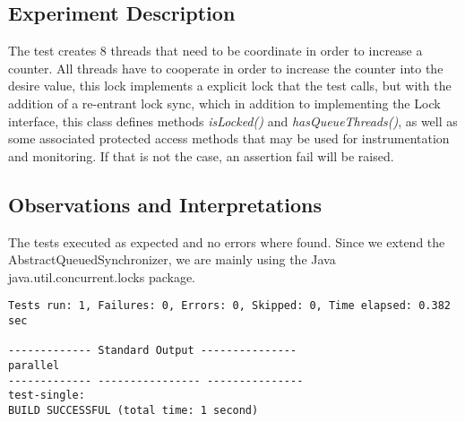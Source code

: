
\subsection{Experiment Description} 
\par
The test creates $8$ threads that need to be coordinate in order to increase a counter. All threads have to cooperate in order to increase the counter into the desire value, this lock implements a explicit lock that the test calls, but with the addition of a re-entrant lock sync, which in addition to implementing the Lock interface, this class defines methods \textit{isLocked()} and \textit{hasQueueThreads()}, as well as some associated protected access methods that may be used for instrumentation and monitoring.
If that is not the case, an assertion fail will be raised.
\par



\subsection{Observations and Interpretations}

\par
The tests executed as expected and no errors where found. Since we extend the AbstractQueuedSynchronizer, we are mainly using the Java java.util.concurrent.locks package.
\begin{lstlisting}[frame=single,breaklines=true]
Tests run: 1, Failures: 0, Errors: 0, Skipped: 0, Time elapsed: 0.382 sec

------------- Standard Output ---------------
parallel
------------- ---------------- ---------------
test-single:
BUILD SUCCESSFUL (total time: 1 second)
\end{lstlisting}




